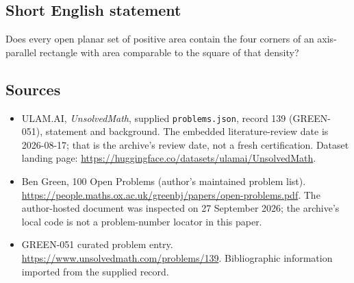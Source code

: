 \documentclass[11pt,a4paper]{article}
\begin{document}
\subsection{Short English statement}

Does every open planar set of positive area contain the four corners of an axis-parallel rectangle with area comparable to the square of that density?

\subsection{Sources}

{\small

\begin{itemize}

\item[\hypertarget{source:139:1}{S1}] ULAM.AI, \emph{UnsolvedMath}, supplied \texttt{problems.json}, record 139 (GREEN-051), statement and background. The embedded literature-review date is 2026-08-17; that is the archive’s review date, not a fresh certification. Dataset landing page: \url{https://huggingface.co/datasets/ulamai/UnsolvedMath}.

\item[\hypertarget{source:139:2}{S2}] Ben Green, 100 Open Problems (author’s maintained problem list). \url{https://people.maths.ox.ac.uk/greenbj/papers/open-problems.pdf}. The author-hosted document was inspected on 27 September 2026; the archive’s local code is not a problem-number locator in this paper.

\item[\hypertarget{source:139:3}{S3}] GREEN-051 curated problem entry. \url{https://www.unsolvedmath.com/problems/139}. Bibliographic information imported from the supplied record.

\end{itemize}

}

\label{end:139}
\end{document}
